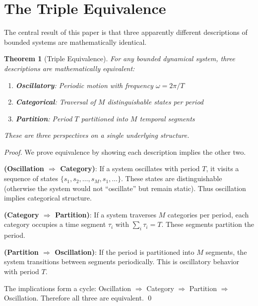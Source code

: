 \documentclass[twocolumn,10pt]{article}
\newtheorem{theorem}{Theorem}[section]
\theoremstyle{definition}
\theoremstyle{remark}
\begin{document}
\section{The Triple Equivalence}
\label{sec:triple}

The central result of this paper is that three apparently different descriptions of bounded systems are mathematically identical.

\begin{theorem}[Triple Equivalence]
\label{thm:triple}
For any bounded dynamical system, three descriptions are mathematically equivalent:
\begin{enumerate}
\item \textbf{Oscillatory}: Periodic motion with frequency $\omega = 2\pi/T$
\item \textbf{Categorical}: Traversal of $M$ distinguishable states per period
\item \textbf{Partition}: Period $T$ partitioned into $M$ temporal segments
\end{enumerate}
These are three perspectives on a single underlying structure.
\end{theorem}

\begin{proof}
We prove equivalence by showing each description implies the other two.

\textbf{(Oscillation $\Rightarrow$ Category)}: If a system oscillates with period $T$, it visits a sequence of states $\{s_1, s_2, \ldots, s_M, s_1, \ldots\}$. These states are distinguishable (otherwise the system would not ``oscillate'' but remain static). Thus oscillation implies categorical structure.

\textbf{(Category $\Rightarrow$ Partition)}: If a system traverses $M$ categories per period, each category occupies a time segment $\tau_i$ with $\sum_i \tau_i = T$. These segments partition the period.

\textbf{(Partition $\Rightarrow$ Oscillation)}: If the period is partitioned into $M$ segments, the system transitions between segments periodically. This is oscillatory behavior with period $T$.

The implications form a cycle: Oscillation $\Rightarrow$ Category $\Rightarrow$ Partition $\Rightarrow$ Oscillation. Therefore all three are equivalent. \qed
\end{proof}
\end{document}
